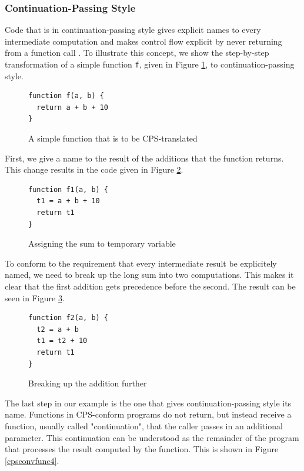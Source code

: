 \documentclass[11pt]{report}
\begin{document}
\subsubsection{Continuation-Passing Style}
Code that is in continuation-passing style gives explicit names to every intermediate computation and makes control flow explicit by never returning from a function call \cite{Morrisett:1999:SFT:319301.319345, DBLP:books/daglib/0022396}. To illustrate this concept, we show the step-by-step transformation of a simple function \texttt{f}, given in Figure \ref{cpsconvfunc1}, to continuation-passing style.

\begin{figure}[ht]
\begin{lstlisting}
function f(a, b) {
  return a + b + 10
}
\end{lstlisting}
\caption{A simple function that is to be CPS-translated}
\label{cpsconvfunc1}
\end{figure}

First, we give a name to the result of the additions that the function returns. This change results in the code given in Figure \ref{cpsconvfunc2}.

\begin{figure}[ht]
\begin{lstlisting}
function f1(a, b) {
  t1 = a + b + 10
  return t1
}
\end{lstlisting}
\caption{Assigning the sum to temporary variable}
\label{cpsconvfunc2}
\end{figure}

To conform to the requirement that every intermediate result be explicitely named, we need to break up the long sum into two computations. This makes it clear that the first addition gets precedence before the second. The result can be seen in Figure \ref{cpsconvfunc3}.

\begin{figure}[ht]
\begin{lstlisting}
function f2(a, b) {
  t2 = a + b
  t1 = t2 + 10
  return t1
}
\end{lstlisting}
\caption{Breaking up the addition further}
\label{cpsconvfunc3}
\end{figure}

The last step in our example is the one that gives continuation-passing style its name. Functions in CPS-conform programs do not return, but instead receive a function, usually called "continuation", that the caller passes in an additional parameter. This continuation can be understood as the remainder of the program that processes the result computed by the function. This is shown in Figure \ref{cpsconvfunc4}.
\end{document}
